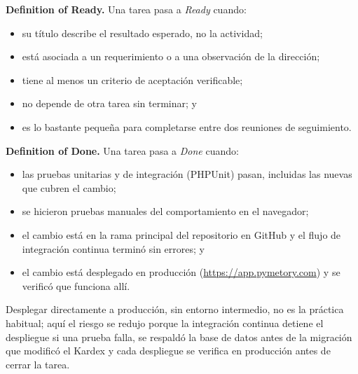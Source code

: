 \textbf{Definition of Ready.} Una tarea pasa a \textit{Ready} cuando:
\begin{itemize}
    \item su título describe el resultado esperado, no la actividad;
    \item está asociada a un requerimiento o a una observación de la dirección;
    \item tiene al menos un criterio de aceptación verificable;
    \item no depende de otra tarea sin terminar; y
    \item es lo bastante pequeña para completarse entre dos reuniones de seguimiento.
\end{itemize}

\textbf{Definition of Done.} Una tarea pasa a \textit{Done} cuando:
\begin{itemize}
    \item las pruebas unitarias y de integración (PHPUnit) pasan, incluidas las nuevas que cubren el cambio;
    \item se hicieron pruebas manuales del comportamiento en el navegador;
    \item el cambio está en la rama principal del repositorio en GitHub y el flujo de integración continua terminó sin errores; y
    \item el cambio está desplegado en producción (\url{https://app.pymetory.com}) y se verificó que funciona allí.
\end{itemize}

Desplegar directamente a producción, sin entorno intermedio, no es la práctica habitual; aquí el riesgo se redujo porque la integración continua detiene el despliegue si una prueba falla, se respaldó la base de datos antes de la migración que modificó el Kardex y cada despliegue se verifica en producción antes de cerrar la tarea.
